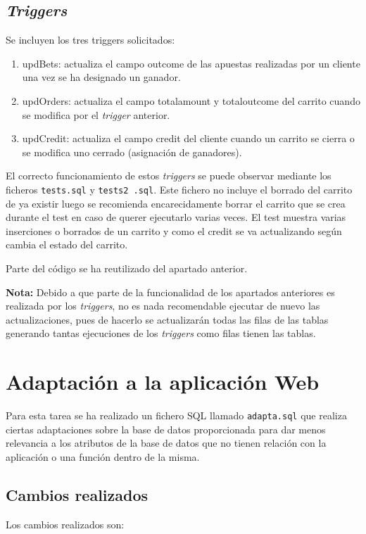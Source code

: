 \documentclass{article}
\begin{document}
\subsection{\textit{Triggers}}
Se incluyen los tres triggers solicitados:
\begin{enumerate}
    \item updBets: actualiza el campo outcome de las apuestas realizadas por un cliente una vez se ha designado un ganador.
    \item updOrders: actualiza el campo totalamount y totaloutcome del carrito cuando se modifica por el \textit{trigger} anterior.
    \item updCredit: actualiza el campo credit del cliente cuando un carrito se cierra o se modifica uno cerrado (asignación de ganadores).
\end{enumerate}

El correcto funcionamiento de estos \textit{triggers} se puede observar mediante los ficheros \texttt{tests.sql} y \texttt{tests2   .sql}. Este fichero no incluye el borrado del carrito de ya existir luego se recomienda encarecidamente borrar el carrito que se crea durante el test en caso de querer ejecutarlo varias veces. El test muestra varias inserciones o borrados de un carrito y como el credit se va actualizando según cambia el estado del carrito.

Parte del código se ha reutilizado del apartado anterior.

\textbf{Nota:} Debido a que parte de la funcionalidad de los apartados anteriores es realizada por los \textit{triggers}, no es nada recomendable ejecutar de nuevo las actualizaciones, pues de hacerlo se actualizarán todas las filas de las tablas generando tantas ejecuciones de los \textit{triggers} como filas tienen las tablas.

\section{Adaptación a la aplicación Web}
Para esta tarea se ha realizado un fichero SQL llamado \texttt{adapta.sql} que realiza ciertas adaptaciones sobre la base de datos proporcionada para dar menos relevancia a los atributos de la base de datos que no tienen relación con la aplicación o una función dentro de la misma.

\subsection{Cambios realizados}
Los cambios realizados son:
\end{document}
